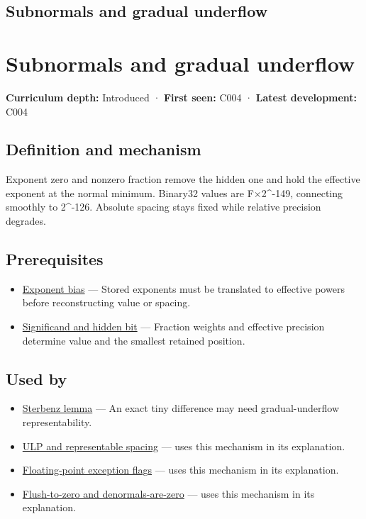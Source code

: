 \hypertarget{appendix-00a6e044c437}{}
\section*{Subnormals and gradual underflow}
\chapter{Subnormals and gradual underflow}\label{appendix-00a6e044c437-subnormals-and-gradual-underflow}

\textbf{Curriculum depth:} Introduced · \textbf{First seen:} C004 · \textbf{Latest development:} C004

\section{Definition and mechanism}\label{appendix-00a6e044c437-definition-and-mechanism}

Exponent zero and nonzero fraction remove the hidden one and hold the effective exponent at the normal minimum. Binary32 values are F×2\^{}-149, connecting smoothly to 2\^{}-126. Absolute spacing stays fixed while relative precision degrades.

\section{Prerequisites}\label{appendix-00a6e044c437-prerequisites}

\begin{itemize}
\tightlist
\item
  \hyperref[appendix-2fae058c82e1]{Exponent bias} --- Stored exponents must be translated to effective powers before reconstructing value or spacing.
\item
  \hyperref[appendix-a24fd710cf67]{Significand and hidden bit} --- Fraction weights and effective precision determine value and the smallest retained position.
\end{itemize}

\section{Used by}\label{appendix-00a6e044c437-used-by}

\begin{itemize}
\item
  \hyperref[appendix-399b7ad53f39]{Sterbenz lemma} --- An exact tiny difference may need gradual-underflow representability.
\item
  \hyperref[appendix-14bab4cab9d4]{ULP and representable spacing} --- uses this mechanism in its explanation.
\item
  \hyperref[appendix-ed8531b46754]{Floating-point exception flags} --- uses this mechanism in its explanation.
\item
  \hyperref[appendix-e979eb012782]{Flush-to-zero and denormals-are-zero} --- uses this mechanism in its explanation.
\end{itemize}

